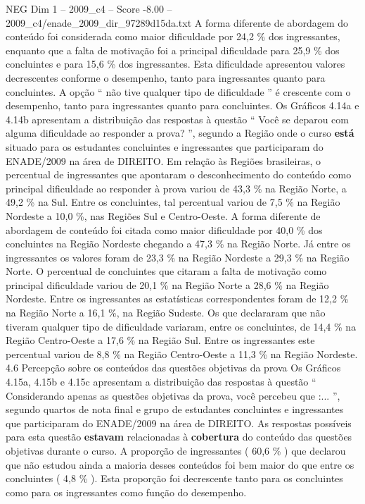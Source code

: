 \begin{textsample}{NEG Dim 1 – 2009\_c4 – Score -8.00 – 2009\_c4/enade\_2009\_dir\_97289d15da.txt}
A forma diferente de abordagem do conteúdo foi considerada como maior dificuldade por 24,2 \% dos ingressantes, enquanto que a falta de motivação foi a principal dificuldade para 25,9 \% dos concluintes e para 15,6 \% dos ingressantes.
Esta dificuldade apresentou valores decrescentes conforme o desempenho, tanto para ingressantes quanto para concluintes.
A opção “ não tive qualquer tipo de dificuldade ” é crescente com o desempenho, tanto para ingressantes quanto para concluintes.
Os Gráficos 4.14a e 4.14b apresentam a distribuição das respostas à questão “ Você se deparou com alguma dificuldade ao responder a prova? ”, segundo a Região onde o curso \textbf{está} situado para os estudantes concluintes e ingressantes que participaram do ENADE/2009 na área de DIREITO.
Em relação às Regiões brasileiras, o percentual de ingressantes que apontaram o desconhecimento do conteúdo como principal dificuldade ao responder à prova variou de 43,3 \% na Região Norte, a 49,2 \% na Sul.
Entre os concluintes, tal percentual variou de 7,5 \% na Região Nordeste a 10,0 \%, nas Regiões Sul e Centro-Oeste.
A forma diferente de abordagem de conteúdo foi citada como maior dificuldade por 40,0 \% dos concluintes na Região Nordeste chegando a 47,3 \% na Região Norte.
Já entre os ingressantes os valores foram de 23,3 \% na Região Nordeste a 29,3 \% na Região Norte.
O percentual de concluintes que citaram a falta de motivação como principal dificuldade variou de 20,1 \% na Região Norte a 28,6 \% na Região Nordeste.
Entre os ingressantes as estatísticas correspondentes foram de 12,2 \% na Região Norte a 16,1 \%, na Região Sudeste.
Os que declararam que não tiveram qualquer tipo de dificuldade variaram, entre os concluintes, de 14,4 \% na Região Centro-Oeste a 17,6 \% na Região Sul.
Entre os ingressantes este percentual variou de 8,8 \% na Região Centro-Oeste a 11,3 \% na Região Nordeste. 4.6 Percepção sobre os conteúdos das questões objetivas da prova Os Gráficos 4.15a, 4.15b e 4.15c apresentam a distribuição das respostas à questão “ Considerando apenas as questões objetivas da prova, você percebeu que :... ”, segundo quartos de nota final e grupo de estudantes concluintes e ingressantes que participaram do ENADE/2009 na área de DIREITO.
As respostas possíveis para esta questão \textbf{estavam} relacionadas à \textbf{cobertura} do conteúdo das questões objetivas durante o curso.
A proporção de ingressantes ( 60,6 \% ) que declarou que não estudou ainda a maioria desses conteúdos foi bem maior do que entre os concluintes ( 4,8 \% ).
Esta proporção foi decrescente tanto para os concluintes como para os ingressantes como função do desempenho.

\end{textsample}
